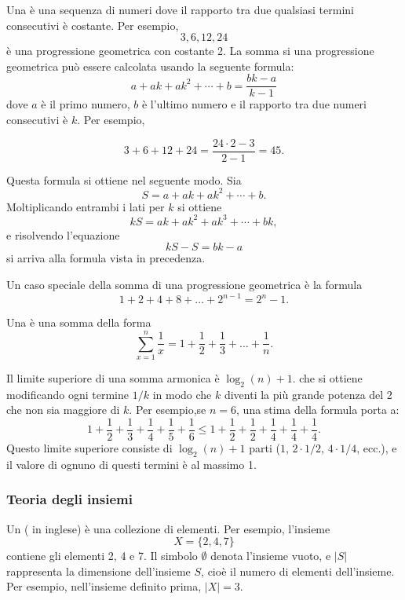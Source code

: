 Una  è una sequenza di numeri
dove il rapporto tra due qualsiasi termini consecutivi 
è costante.
Per esempio,
\[3,6,12,24\]
è una progressione geometrica con costante 2.
La somma si una progressione geometrica può essere calcolata
usando la seguente formula:
\[a + ak + ak^2 + \cdots + b = \frac{bk-a}{k-1}\]
dove $a$ è il primo numero,
$b$ è l'ultimo numero e il rapporto
tra due numeri consecutivi è $k$.
Per esempio,

\[3+6+12+24=\frac{24 \cdot 2 - 3}{2-1} = 45.\]

Questa formula si ottiene nel seguente modo. 
Sia
\[ S = a + ak + ak^2 + \cdots + b .\]
Moltiplicando entrambi i lati per $k$ si ottiene
\[ kS = ak + ak^2 + ak^3 + \cdots + bk,\]
e risolvendo l'equazione
\[ kS-S = bk-a\]
si arriva alla formula vista in precedenza.

Un caso speciale della somma di una progressione geometrica 
è la formula
\[1+2+4+8+\ldots+2^{n-1}=2^n-1.\]


Una  è una somma della forma
\[ \sum_{x=1}^n \frac{1}{x} = 1+\frac{1}{2}+\frac{1}{3}+\ldots+\frac{1}{n}.\]

Il limite superiore di una somma armonica è $\log_2(n)+1$.
che si ottiene modificando ogni termine $1/k$  in modo che
$k$ diventi la più grande potenza del 2 che non sia maggiore di $k$.
Per esempio,se $n=6$, una stima della formula porta a: 
\[ 1+\frac{1}{2}+\frac{1}{3}+\frac{1}{4}+\frac{1}{5}+\frac{1}{6} \le
1+\frac{1}{2}+\frac{1}{2}+\frac{1}{4}+\frac{1}{4}+\frac{1}{4}.\]
Questo limite superiore consiste di $\log_2(n)+1$ parti
($1$, $2 \cdot 1/2$, $4 \cdot 1/4$, ecc.),
e il valore di ognuno di questi termini è al massimo 1.

\subsubsection{Teoria degli insiemi}


Un  ( in inglese) è una collezione di elementi.
Per esempio, l'insieme
\[X=\{2,4,7\}\]
contiene gli elementi 2, 4 e 7.
Il simbolo $\emptyset$ denota l'insieme vuoto,
e $|S|$ rappresenta la dimensione dell'insieme $S$,
cioè il numero di elementi dell'insieme.
Per esempio, nell'insieme definito prima,
$|X|=3$. 

